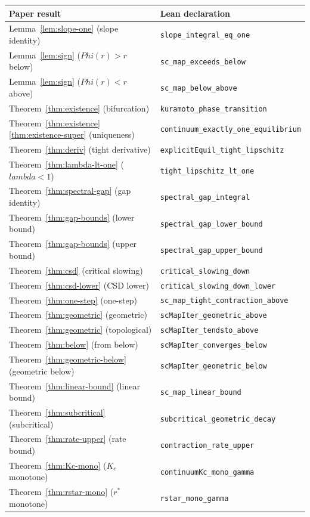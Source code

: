 \documentclass[11pt,a4paper]{article}
\let\Phi\relax\def\Phi{Phi}%
\let\lambda\relax\def\lambda{lambda}%
\theoremstyle{definition}
\begin{document}
\begin{center}
\begin{tabular}{ll}
\toprule
\textbf{Paper result} & \textbf{Lean declaration} \\
\midrule
Lemma~\ref{lem:slope-one} (slope identity) & \texttt{slope\_integral\_eq\_one} \\
Lemma~\ref{lem:sign} ($\Phi(r) > r$ below) & \texttt{sc\_map\_exceeds\_below} \\
Lemma~\ref{lem:sign} ($\Phi(r) < r$ above) & \texttt{sc\_map\_below\_above} \\
Theorem~\ref{thm:existence} (bifurcation) & \texttt{kuramoto\_phase\_transition} \\
Theorem~\ref{thm:existence}\ref{thm:existence-super} (uniqueness) & \texttt{continuum\_exactly\_one\_equilibrium} \\
Theorem~\ref{thm:deriv} (tight derivative) & \texttt{explicitEquil\_tight\_lipschitz} \\
Theorem~\ref{thm:lambda-lt-one} ($\lambda < 1$) & \texttt{tight\_lipschitz\_lt\_one} \\
Theorem~\ref{thm:spectral-gap} (gap identity) & \texttt{spectral\_gap\_integral} \\
Theorem~\ref{thm:gap-bounds} (lower bound) & \texttt{spectral\_gap\_lower\_bound} \\
Theorem~\ref{thm:gap-bounds} (upper bound) & \texttt{spectral\_gap\_upper\_bound} \\
Theorem~\ref{thm:csd} (critical slowing) & \texttt{critical\_slowing\_down} \\
Theorem~\ref{thm:csd-lower} (CSD lower) & \texttt{critical\_slowing\_down\_lower} \\
Theorem~\ref{thm:one-step} (one-step) & \texttt{sc\_map\_tight\_contraction\_above} \\
Theorem~\ref{thm:geometric} (geometric) & \texttt{scMapIter\_geometric\_above} \\
Theorem~\ref{thm:geometric} (topological) & \texttt{scMapIter\_tendsto\_above} \\
Theorem~\ref{thm:below} (from below) & \texttt{scMapIter\_converges\_below} \\
Theorem~\ref{thm:geometric-below} (geometric below) & \texttt{scMapIter\_geometric\_below} \\
Theorem~\ref{thm:linear-bound} (linear bound) & \texttt{sc\_map\_linear\_bound} \\
Theorem~\ref{thm:subcritical} (subcritical) & \texttt{subcritical\_geometric\_decay} \\
Theorem~\ref{thm:rate-upper} (rate bound) & \texttt{contraction\_rate\_upper} \\
Theorem~\ref{thm:Kc-mono} ($K_c$ monotone) & \texttt{continuumKc\_mono\_gamma} \\
Theorem~\ref{thm:rstar-mono} ($r^*$ monotone) & \texttt{rstar\_mono\_gamma} \\
\bottomrule
\end{tabular}
\end{center}
\end{document}
